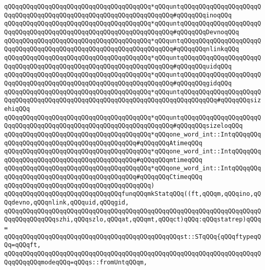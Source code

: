 \verb|qQQqqQQqqQQqqQQqqQQqqQQqqQQqqQQqqQQqqQQq*qQQquntqQQqqQQqqQQqqQQqqQQqqQQqqQQqqQQqqQQqqQQqqQQqqQQqqQQqqQQqqQQqqQQqqQQq#qQQqqQQqinoqQQq|\newline
\verb|qQQqqQQqqQQqqQQqqQQqqQQqqQQqqQQqqQQqqQQq*qQQquntqQQqqQQqqQQqqQQqqQQqqQQqqQQqqQQqqQQqqQQqqQQqqQQqqQQqqQQqqQQqqQQqqQQq#qQQqqQQqDevnoqQQq|\newline
\verb|qQQqqQQqqQQqqQQqqQQqqQQqqQQqqQQqqQQqqQQq*qQQquntqQQqqQQqqQQqqQQqqQQqqQQqqQQqqQQqqQQqqQQqqQQqqQQqqQQqqQQqqQQqqQQqqQQq#qQQqqQQqnlinkqQQq|\newline
\verb|qQQqqQQqqQQqqQQqqQQqqQQqqQQqqQQqqQQqqQQq*qQQquntqQQqqQQqqQQqqQQqqQQqqQQqqQQqqQQqqQQqqQQqqQQqqQQqqQQqqQQqqQQqqQQqqQQq#qQQqqQQquidqQQq|\newline
\verb|qQQqqQQqqQQqqQQqqQQqqQQqqQQqqQQqqQQqqQQq*qQQquntqQQqqQQqqQQqqQQqqQQqqQQqqQQqqQQqqQQqqQQqqQQqqQQqqQQqqQQqqQQqqQQqqQQq#qQQqqQQqgidqQQq|\newline
\verb|qQQqqQQqqQQqqQQqqQQqqQQqqQQqqQQqqQQqqQQq*qQQquntqQQqqQQqqQQqqQQqqQQqqQQqqQQqqQQqqQQqqQQqqQQqqQQqqQQqqQQqqQQqqQQqqQQqqQQqqQQqqQQq#qQQqqQQqsizehiqQQq|\newline
\verb|qQQqqQQqqQQqqQQqqQQqqQQqqQQqqQQqqQQqqQQq*qQQquntqQQqqQQqqQQqqQQqqQQqqQQqqQQqqQQqqQQqqQQqqQQqqQQqqQQqqQQqqQQqqQQqqQQq#qQQqqQQqsizeloqQQq|\newline
\verb|qQQqqQQqqQQqqQQqqQQqqQQqqQQqqQQqqQQqqQQq*qQQqone_word_int::IntqQQqqQQqqQQqqQQqqQQqqQQqqQQqqQQqqQQqqQQqqQQq#qQQqqQQqAtimeqQQq|\newline
\verb|qQQqqQQqqQQqqQQqqQQqqQQqqQQqqQQqqQQqqQQq*qQQqone_word_int::IntqQQqqQQqqQQqqQQqqQQqqQQqqQQqqQQqqQQqqQQqqQQq#qQQqqQQqmtimeqQQq|\newline
\verb|qQQqqQQqqQQqqQQqqQQqqQQqqQQqqQQqqQQqqQQq*qQQqone_word_int::IntqQQqqQQqqQQqqQQqqQQqqQQqqQQqqQQqqQQqqQQqqQQq#qQQqqQQqCtimeqQQq|\newline
\verb|qQQqqQQqqQQqqQQqqQQqqQQqqQQqqQQqqQQqqQQq)|\newline
\verb|qQQqqQQqqQQqqQQqqQQqqQQqqQQqqQQqfunqQQqmkStatqQQq((ft,qQQqm,qQQqino,qQQqdevno,qQQqnlink,qQQquid,qQQqgid,|\newline
\verb|qQQqqQQqqQQqqQQqqQQqqQQqqQQqqQQqqQQqqQQqqQQqqQQqqQQqqQQqqQQqqQQqqQQqqQQqqQQqqQQqqQQqszhi,qQQqszlo,qQQqat,qQQqmt,qQQqct)qQQq:qQQqstatrep)qQQq=|\newline
\verb|qQQqqQQqqQQqqQQqqQQqqQQqqQQqqQQqqQQqqQQqqQQqqQQqst::STqQQq{qQQqftypeqQQq=qQQqft,|\newline
\verb|qQQqqQQqqQQqqQQqqQQqqQQqqQQqqQQqqQQqqQQqqQQqqQQqqQQqqQQqqQQqqQQqqQQqqQQqqQQqqQQqmodeqQQq=qQQqs::fromUntqQQqm,|\newline
